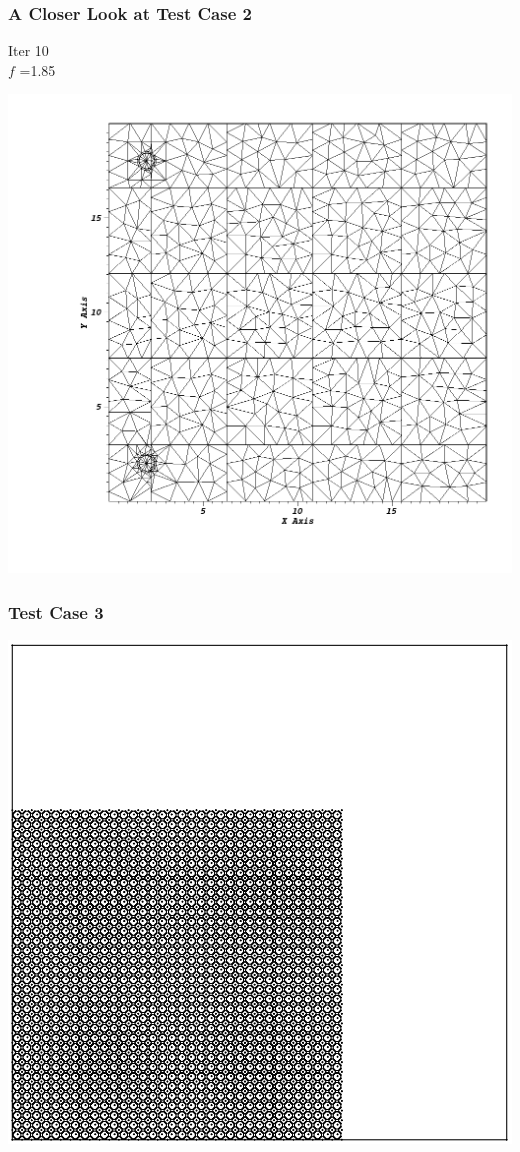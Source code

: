 \documentclass[]{beamer}
\begin{document}
\begin{frame}[t]\frametitle{A Closer Look at Test Case 2}
\begin{minipage}{0.15\textwidth}
\begin{footnotesize}
Iter 10\\
$f$ =1.85
\end{footnotesize}
\end{minipage}
\begin{minipage}{0.8\textwidth}
\centering
\includegraphics[scale=0.22]{figures/sameside_after.png}
\end{minipage}
\end{frame}

\begin{frame}[t]\frametitle{Test Case 3}
\centering
\includegraphics[scale = 0.4]{figures/lattice-12-shifted-eps-converted-to.pdf}
\end{frame}
\end{document}
